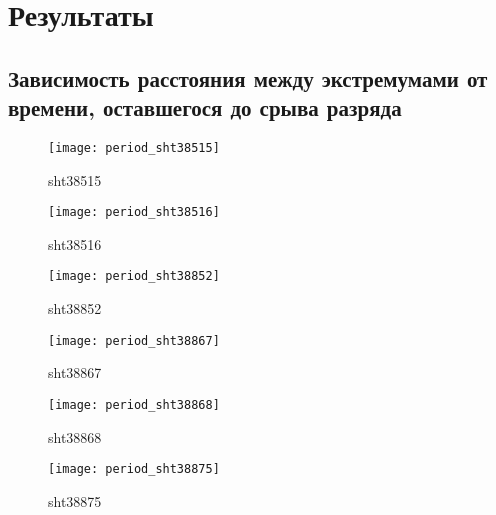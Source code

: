 \section{Результаты}
\subsection{Зависимость расстояния между экстремумами от времени, оставшегося до срыва разряда}

\begin{figure}[H]
	\begin{minipage}[H]{0.49\linewidth}
		\begin{center}
			\texttt{[image: period\_sht38515]}
			\caption{sht38515}
		\end{center}
	\end{minipage}
	\hfill
	\begin{minipage}[H]{0.49\linewidth}
		\begin{center}
			\texttt{[image: period\_sht38516]}
			\caption{sht38516}
		\end{center}
	\end{minipage}	
\end{figure}

\begin{figure}[H]
	\begin{minipage}[H]{0.49\linewidth}
		\begin{center}
			\texttt{[image: period\_sht38852]}
			\caption{sht38852}
		\end{center}
	\end{minipage}
	\hfill
	\begin{minipage}[H]{0.49\linewidth}
		\begin{center}
			\texttt{[image: period\_sht38867]}
			\caption{sht38867}
		\end{center}
	\end{minipage}	
\end{figure}

\begin{figure}[H]
	\begin{minipage}[H]{0.49\linewidth}
		\begin{center}
			\texttt{[image: period\_sht38868]}
			\caption{sht38868}
		\end{center}
	\end{minipage}
	\hfill
	\begin{minipage}[H]{0.49\linewidth}
		\begin{center}
			\texttt{[image: period\_sht38875]}
			\caption{sht38875}
		\end{center}
	\end{minipage}	
\end{figure}


